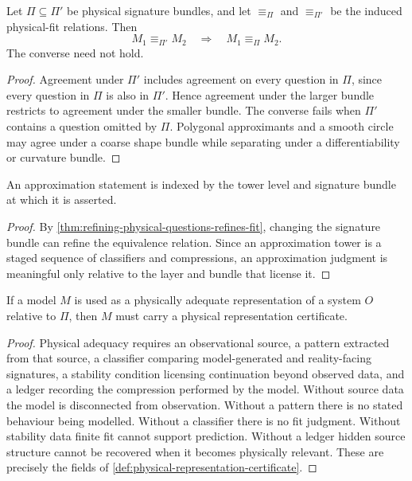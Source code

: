 \begin{theorem}
\label{thm:refining-physical-questions-refines-fit}
Let $\Pi\subseteq\Pi'$ be physical signature bundles, and let $\equiv_{\Pi}$ and $\equiv_{\Pi'}$ be the induced physical-fit relations. Then
$$
M_1\equiv_{\Pi'}M_2
\quad\Longrightarrow\quad
M_1\equiv_{\Pi}M_2.
$$
The converse need not hold.
\end{theorem}

\begin{proof}
Agreement under $\Pi'$ includes agreement on every question in $\Pi$, since every question in $\Pi$ is also in $\Pi'$. Hence agreement under the larger bundle restricts to agreement under the smaller bundle. The converse fails when $\Pi'$ contains a question omitted by $\Pi$. Polygonal approximants and a smooth circle may agree under a coarse shape bundle while separating under a differentiability or curvature bundle.
\end{proof}

\begin{corollary}
\label{cor:approximation-is-tower-relative}
An approximation statement is indexed by the tower level and signature bundle at which it is asserted.
\end{corollary}

\begin{proof}
By \autoref{thm:refining-physical-questions-refines-fit}, changing the signature bundle can refine the equivalence relation. Since an approximation tower is a staged sequence of classifiers and compressions, an approximation judgment is meaningful only relative to the layer and bundle that license it.
\end{proof}

\begin{theorem}
\label{thm:physical-adequacy-requires-representation-certificate}
If a model $M$ is used as a physically adequate representation of a system $O$ relative to $\Pi$, then $M$ must carry a physical representation certificate.
\end{theorem}

\begin{proof}
Physical adequacy requires an observational source, a pattern extracted from that source, a classifier comparing model-generated and reality-facing signatures, a stability condition licensing continuation beyond observed data, and a ledger recording the compression performed by the model. Without source data the model is disconnected from observation. Without a pattern there is no stated behaviour being modelled. Without a classifier there is no fit judgment. Without stability data finite fit cannot support prediction. Without a ledger hidden source structure cannot be recovered when it becomes physically relevant. These are precisely the fields of \autoref{def:physical-representation-certificate}.
\end{proof}

